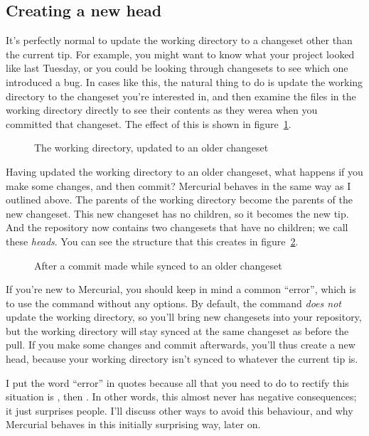 \subsection{Creating a new head}

It's perfectly normal to update the working directory to a changeset
other than the current tip.  For example, you might want to know what
your project looked like last Tuesday, or you could be looking through
changesets to see which one introduced a bug.  In cases like this, the
natural thing to do is update the working directory to the changeset
you're interested in, and then examine the files in the working
directory directly to see their contents as they werea when you
committed that changeset.  The effect of this is shown in
figure~\ref{fig:concepts:wdir-pre-branch}.

\begin{figure}[ht]
  \centering
  \caption{The working directory, updated to an older changeset}
  \label{fig:concepts:wdir-pre-branch}
\end{figure}

Having updated the working directory to an older changeset, what
happens if you make some changes, and then commit?  Mercurial behaves
in the same way as I outlined above.  The parents of the working
directory become the parents of the new changeset.  This new changeset
has no children, so it becomes the new tip.  And the repository now
contains two changesets that have no children; we call these
\emph{heads}.  You can see the structure that this creates in
figure~\ref{fig:concepts:wdir-branch}.

\begin{figure}[ht]
  \centering
  \caption{After a commit made while synced to an older changeset}
  \label{fig:concepts:wdir-branch}
\end{figure}

\begin{note}
  If you're new to Mercurial, you should keep in mind a common
  ``error'', which is to use the  command without any
  options.  By default, the  command \emph{does not}
  update the working directory, so you'll bring new changesets into
  your repository, but the working directory will stay synced at the
  same changeset as before the pull.  If you make some changes and
  commit afterwards, you'll thus create a new head, because your
  working directory isn't synced to whatever the current tip is.

  I put the word ``error'' in quotes because all that you need to do
  to rectify this situation is , then .  In
  other words, this almost never has negative consequences; it just
  surprises people.  I'll discuss other ways to avoid this behaviour,
  and why Mercurial behaves in this initially surprising way, later
  on.
\end{note}


